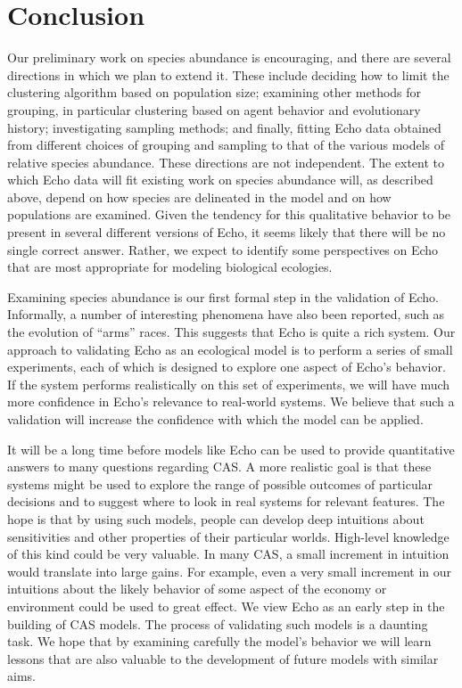 \section{Conclusion}

Our preliminary work on species abundance is encouraging, and
there are several directions in which we plan to extend it.  These
include deciding how to limit the clustering algorithm based on
population size; examining other methods for grouping, in particular
clustering based on agent behavior and evolutionary history;
investigating sampling methods; and finally, fitting Echo data
obtained from different choices of grouping and sampling to that of
the various models of relative species abundance.
These directions are not independent. The extent to which Echo data
will fit existing work on species abundance will, as described above,
depend on how species are delineated in the model and on how
populations are examined. Given the tendency for this qualitative
behavior to be present in several different versions of Echo, it seems
likely that there will be no single correct answer.  Rather, we expect
to identify some perspectives on Echo that are most appropriate for
modeling biological ecologies.

Examining species abundance is our first formal step in the validation
of Echo.  Informally, a number of interesting phenomena have also been
reported, such as the evolution of ``arms'' races.  This suggests that
Echo is quite a rich system.  Our approach to validating Echo as an
ecological model is to perform a series of small experiments, each of
which is designed to explore one aspect of Echo's behavior.  If the
system performs realistically on this set of experiments, we will have
much more confidence in Echo's relevance to real-world systems.
We believe that such a validation will increase the confidence with
which the model can be applied.  

It will be a long time before models like Echo can be used to provide
quantitative answers to many questions regarding CAS.  A more realistic
goal is that these systems might be used to explore the range of
possible outcomes of particular decisions and to suggest where to look
in real systems for relevant features.  The hope is that by using such
models, people can develop deep intuitions about sensitivities and
other properties of their particular worlds.  High-level knowledge of
this kind could be very valuable.  In many CAS, a small increment in
intuition would translate into large gains.  For example, even a very
small increment in our intuitions about the likely behavior of some
aspect of the economy or environment could be used to great effect.
We view Echo as an early step in the
building of CAS models.  The process of validating such models is a
daunting task.  We hope that by examining carefully the model's
behavior we will learn lessons that are also valuable to the
development of future models with similar aims.


